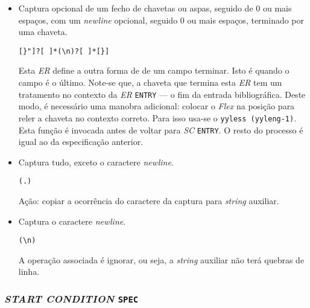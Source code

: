 \begin{itemize}
\item Captura opcional de um fecho de chavetas ou aspas, seguido de 0 ou mais
	espaços, com um \emph{newline} opcional, seguido 0 ou mais espaços, terminado
	por uma chaveta. 
\begin{verbatim}
[}"]?[ ]*(\n)?[ ]*[}]
\end{verbatim}

Esta \emph{ER} define a outra forma de de um campo terminar. Isto é quando
o campo é o último. Note-se que, a chaveta que termina esta \emph{ER} tem um
tratamento no contexto da \emph{ER} \texttt{ENTRY} --- o fim da entrada
bibliográfica. Deste modo, é necessário uma manobra adicional: colocar
o \emph{Flex} na posição para reler a chaveta no contexto correto. Para isso
usa-se o \texttt{yyless (yyleng-1)}. Esta função é invocada antes de voltar para
\emph{SC} \texttt{ENTRY}. O resto do processo é igual ao da especificação
anterior.  

\item Captura tudo, exceto o caractere \emph{newline}. 
\begin{verbatim}
(.)
\end{verbatim}

Ação: copiar a ocorrência do caractere da captura para \emph{string} auxiliar. 

\item Captura o caractere \emph{newline}.  
\begin{verbatim}
(\n)
\end{verbatim}

A operação associada é ignorar, ou seja, a \emph{string} auxiliar não terá
quebras de linha. 

\end{itemize}
\subsubsection{\emph{START CONDITION} \texttt{SPEC}}

